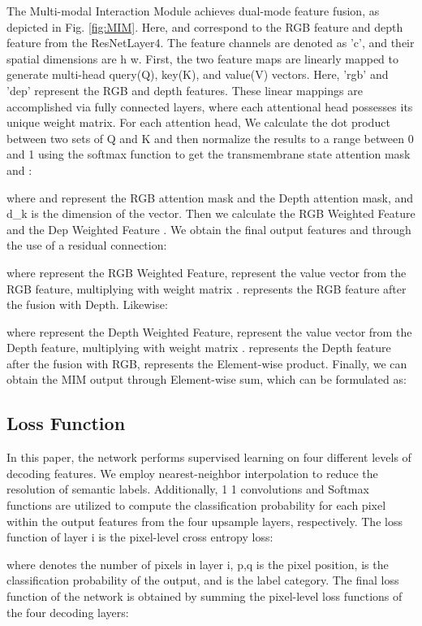 \documentclass{aims}
\numberwithin{equation}{section}
\begin{document}
The Multi-modal Interaction Module achieves dual-mode feature fusion, as depicted in Fig. \ref{fig:MIM}. Here,  and  correspond to the RGB feature and depth feature from the ResNetLayer4. The feature channels are denoted as 'c', and their spatial dimensions are h  w. First, the two feature maps are linearly mapped to generate multi-head query(Q), key(K), and value(V) vectors. Here, 'rgb' and 'dep' represent the RGB and depth features. These linear mappings are accomplished via fully connected layers, where each attentional head possesses its unique weight matrix. For each attention head, We calculate the dot product between two sets of Q and K and then normalize the results to a range between 0 and 1 using the softmax function to get the transmembrane state attention mask  and :



where  and  represent the RGB attention mask and the Depth attention mask, and d\_k is the dimension of the vector. Then we calculate the RGB Weighted Feature  and the Dep Weighted Feature . We obtain the final output features  and  through the use of a residual connection:



where  represent the RGB Weighted Feature, represent the value vector from the RGB feature, multiplying with weight matrix .  represents the RGB feature after the fusion with Depth. Likewise:


where  represent the Depth Weighted Feature,  represent the value vector from the Depth feature, multiplying with weight matrix .  represents the Depth feature after the fusion with RGB,  represents the Element-wise product. Finally, we can obtain the MIM output through Element-wise sum, which can be formulated as:


\subsection{Loss Function}

In this paper, the network performs supervised learning on four different levels of decoding features. We employ nearest-neighbor interpolation to reduce the resolution of semantic labels.  Additionally, 1  1 convolutions and Softmax functions are utilized to compute the classification probability for each pixel within the output features from the four upsample layers, respectively. The loss function  of layer i is the pixel-level cross entropy loss: 

where  denotes the number of pixels in layer i, p,q is the pixel position,  is the classification probability of the output, and  is the label category. The final loss function  of the network is obtained by summing the pixel-level loss functions of the four decoding layers:
\end{document}
